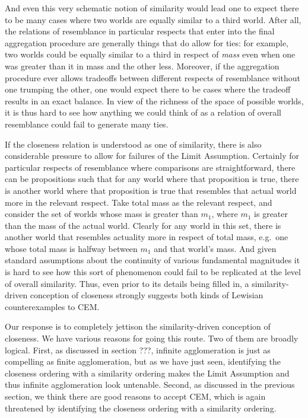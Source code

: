 \documentclass[leqno, 11pt, a5paper, openany]{article}
\begin{document}
And even this very schematic notion of similarity would lead one to expect there to be many cases where two worlds are equally similar to a third world. After all, the relations of resemblance in particular respects that enter into the final aggregation procedure are generally things that do allow for ties: for example, two worlds could be equally similar to a third in respect of \emph{mass} even when one was greater than it in mass and the other less. Moreover, if the aggregation procedure ever allows tradeoffs between different respects of resemblance without one trumping the other, one would expect there to be cases where the tradeoff results in an exact balance. In view of the richness of the space of possible worlds, it is thus hard to see how anything we could think of as a relation of overall resemblance could fail to generate many ties.

If the closeness relation is understood as one of similarity, there is also considerable pressure to allow for failures of the Limit Assumption. Certainly for particular respects of resemblance where comparisons are straightforward, there can be propositions such that for any world where that proposition is true, there is another world where that proposition is true that resembles that actual world more in the relevant respect. Take total mass as the relevant respect, and consider the set of worlds whose mass is greater than $m_1$, where $m_1$ is greater than the mass of the actual world. Clearly for any world in this set, there is another world that resembles actuality more in respect of total mass, e.g.~one whose total mass is halfway between $m_1$ and that world's mass. And given standard assumptions about the continuity of various fundamental magnitudes it is hard to see how this sort of phenomenon could fail to be replicated at the level of overall similarity. Thus, even prior to its details being filled in, a similarity-driven conception of closeness strongly suggests both kinds of Lewisian counterexamples to CEM.

Our response is to completely jettison the similarity-driven conception of closeness. We have various reasons for going this route. Two of them are broadly logical. First, as discussed in section ???, infinite agglomeration is just as compelling as finite agglomeration, but as we have just seen, identifying the closeness ordering with a similarity ordering makes the Limit Assumption and thus infinite agglomeration look untenable. Second, as discussed in the previous section, we think there are good reasons to accept CEM, which is again threatened by identifying the closeness ordering with a similarity ordering. 
\end{document}
